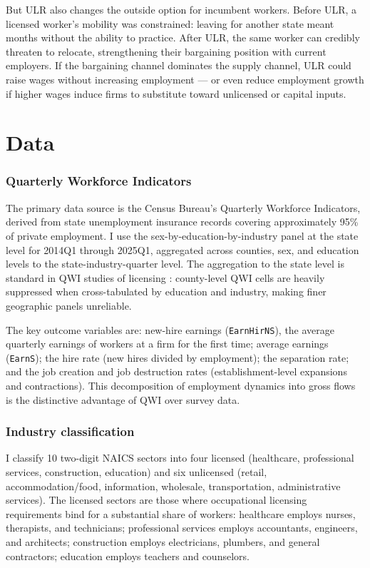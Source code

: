 \documentclass[12pt]{article}
\begin{document}
But ULR also changes the outside option for incumbent workers. Before ULR, a licensed worker's mobility was constrained: leaving for another state meant months without the ability to practice. After ULR, the same worker can credibly threaten to relocate, strengthening their bargaining position with current employers. If the bargaining channel dominates the supply channel, ULR could raise wages without increasing employment --- or even reduce employment growth if higher wages induce firms to substitute toward unlicensed or capital inputs.


\section{Data}
\label{sec:data}

\subsubsection*{Quarterly Workforce Indicators} The primary data source is the Census Bureau's Quarterly Workforce Indicators, derived from state unemployment insurance records covering approximately 95\% of private employment. I use the sex-by-education-by-industry panel at the state level for 2014Q1 through 2025Q1, aggregated across counties, sex, and education levels to the state-industry-quarter level. The aggregation to the state level is standard in QWI studies of licensing \citep{TimmonsBae2023}: county-level QWI cells are heavily suppressed when cross-tabulated by education and industry, making finer geographic panels unreliable.

The key outcome variables are: new-hire earnings (\texttt{EarnHirNS}), the average quarterly earnings of workers at a firm for the first time; average earnings (\texttt{EarnS}); the hire rate (new hires divided by employment); the separation rate; and the job creation and job destruction rates (establishment-level expansions and contractions). This decomposition of employment dynamics into gross flows is the distinctive advantage of QWI over survey data.

\subsubsection*{Industry classification} I classify 10 two-digit NAICS sectors into four licensed (healthcare, professional services, construction, education) and six unlicensed (retail, accommodation/food, information, wholesale, transportation, administrative services). The licensed sectors are those where occupational licensing requirements bind for a substantial share of workers: healthcare employs nurses, therapists, and technicians; professional services employs accountants, engineers, and architects; construction employs electricians, plumbers, and general contractors; education employs teachers and counselors.
\end{document}
